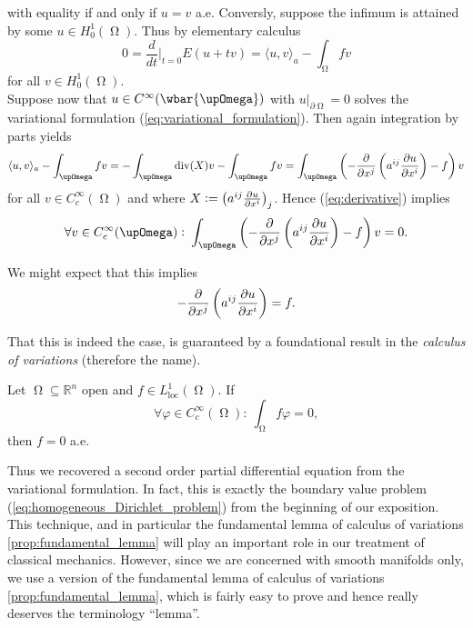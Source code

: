 \noindent with equality if and only if $u = v$ a.e. Conversly, suppose the infimum is attained by some $u \in H^1_0(\upOmega)$. Thus by elementary calculus
\begin{equation}
	\label{eq:derivative}
	0 = \frac{d}{dt}\bigg\vert_{t = 0} E(u + tv) = \langle u, v \rangle_a - \int_\upOmega f v
\end{equation}
\noindent for all $v \in H^1_0(\upOmega)$.\\
Suppose now that $u \in C^\infty(\wbar{\upOmega})$ with $u\vert_{\partial \upOmega} = 0$ solves the variational formulation (\ref{eq:variational_formulation}). Then again integration by parts yields
\begin{equation*}
	\langle u, v \rangle_a - \int_\upOmega f v = -\int_\upOmega \mathrm{div}(X) v - \int_\upOmega fv = \int_\upOmega \del[3]{-\frac{\partial}{\partial x^j}\del[3]{a^{ij}\frac{\partial u}{\partial x^i}} - f} v
\end{equation*}
\noindent for all $v \in C^\infty_c(\upOmega)$ and where $X := \del[1]{a^{ij}\frac{\partial u}{\partial x^i}}_j$. Hence (\ref{eq:derivative}) implies 
\begin{equation*}
	\forall v \in C^\infty_c(\upOmega): \> \int_\upOmega \del[3]{-\frac{\partial}{\partial x^j}\del[3]{a^{ij}\frac{\partial u}{\partial x^i}} - f} v = 0.
\end{equation*}

We might expect that this implies 
\begin{equation*}
	-\frac{\partial}{\partial x^j}\del[3]{a^{ij}\frac{\partial u}{\partial x^i}} = f.
\end{equation*}

That this is indeed the case, is guaranteed by a foundational result in the \emph{calculus of variations} (therefore the name).

\begin{proposition}
	\label{prop:fundamental_lemma}
	Let $\upOmega \subseteq \mathbb{R}^n$ open and $f \in L^1_{\mathrm{loc}}(\upOmega)$. If
	\begin{equation*}
		\forall \varphi \in C^\infty_c(\upOmega): \> \int_\upOmega f\varphi = 0,
	\end{equation*}
	\noindent then $f = 0$ a.e.
\end{proposition}

Thus we recovered a second order partial differential equation from the variational formulation. In fact, this is exactly the boundary value problem (\ref{eq:homogeneous_Dirichlet_problem}) from the beginning of our exposition. This technique, and in particular the fundamental lemma of calculus of variations \ref{prop:fundamental_lemma} will play an important role in our treatment of classical mechanics. However, since we are concerned with smooth manifolds only, we use a version of the fundamental lemma of calculus of variations \ref{prop:fundamental_lemma}, which is fairly easy to prove and hence really deserves the terminology ``lemma''.

